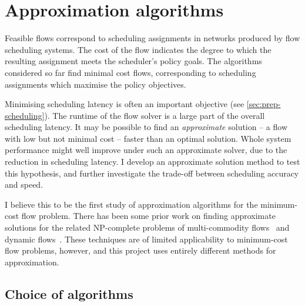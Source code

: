 
\section{Approximation algorithms} \label{sec:impl-approx}


Feasible flows correspond to scheduling assignments in networks produced by flow scheduling systems. The cost of the flow indicates the degree to which the resulting assignment meets the scheduler's policy goals. The algorithms considered so far find minimal cost flows, corresponding to scheduling assignments which maximise the policy objectives.

Minimising scheduling latency is often an important objective (see \cref{sec:prep-scheduling}). The runtime of the flow solver is a large part of the overall scheduling latency. It may be possible to find an \emph{approximate} solution -- a flow with low but not minimal cost -- faster than an optimal solution. Whole system performance might well improve under such an approximate solver, due to the reduction in scheduling latency. I develop an approximate solution method to test this hypothesis, and further investigate the trade-off between scheduling accuracy and speed.

I believe this to be the first study of approximation algorithms for the minimum-cost flow problem. There has been some prior work on finding approximate solutions for the related NP-complete problems of multi-commodity flows~\cite{Garg:2007} and dynamic flows~\cite{Hoppe:1994}. These techniques are of limited applicability to minimum-cost flow problems\footnotemark, however, and this project uses entirely different methods for approximation.

\subsection{Choice of algorithms} \label{sec:impl-approx-choice}

